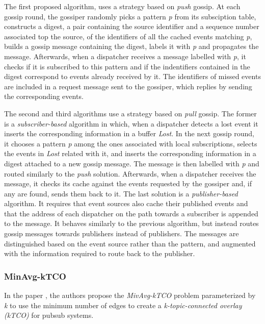 The first proposed algorithm, uses a strategy based on \textit{push} gossip. At each gossip round, the gossiper randomly picks a pattern \textit{p} from its subsciption table, constructs a digest, a pair containing the source identifier and a sequence number associated top the source, of the identifiers of all the cached events matching \textit{p}, builds a gossip message containing the digest, labels it with \textit{p} and propagates the message. Afterwards, when a dispatcher receives a message labelled with \textit{p}, it checks if it is subscribed to this pattern and if the indentifiers contained in the digest correspond to events already received by it. The identifiers of missed events are included in a request message sent to the gossiper, which replies by sending the corresponding events.

The second and third algorithms use a strategy based on \textit{pull} gossip. The former is a \textit{subscriber-based} algorithm in which, when a dispatcher detects a lost event it inserts the corresponding information in a buffer \textit{Lost}. In the next gossip round, it chooses a pattern \textit{p} among the ones associated with local subscriptions, selects the events in \textit{Lost} related with it, and inserts the corresponding information in a digest attached to a new gossip message. The message is then labelled with \textit{p} and routed similarly to the \textit{push} solution. Afterwards, when a dispatcher receives the message, it checks its  cache against the events requested by the gossiper and, if any are found, sends them back to it. The last solution is a \textit{publisher-based} algorithm. It requires that event sources also cache their published events and that the address of each dispatcher on the path towards a subscriber is appended to the message. It behaves similarly to the previous algorithm, but instead routes gossip messages towards publishers instead of publishers. The messages are distinguished based on the event source rather than the pattern, and augmented with the information required to route back to the publisher.


\subsubsection{MinAvg-kTCO}
\label{sec:minavg_tco}

In the paper \cite{minavg-k-tco}, the authors propose the \textit{MivAvg-kTCO} problem parameterized by \textit{k} to use the minimum number of edges to create a \textit{k-topic-connected overlay ({kTCO})} for \gls{pubsub} systems.

